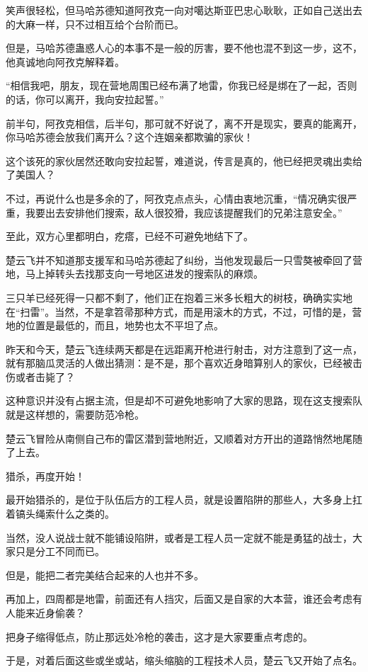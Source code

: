 笑声很轻松，但马哈苏德知道阿孜克一向对噶达斯亚巴忠心耿耿，正如自己送出去的大麻一样，只不过相互给个台阶而已。

但是，马哈苏德蛊惑人心的本事不是一般的厉害，要不他也混不到这一步，这不，他真诚地向阿孜克解释着。

“相信我吧，朋友，现在营地周围已经布满了地雷，你我已经是绑在了一起，否则的话，你可以离开，我向安拉起誓。”

前半句，阿孜克相信，后半句，那可就不好说了，离不开是现实，要真的能离开，你马哈苏德会放我们离开么？这个连姻亲都欺骗的家伙！

这个该死的家伙居然还敢向安拉起誓，难道说，传言是真的，他已经把灵魂出卖给了美国人？

不过，再说什么也是多余的了，阿孜克点点头，心情由衷地沉重，“情况确实很严重，我要出去安排他们搜索，敌人很狡猾，我应该提醒我们的兄弟注意安全。”

至此，双方心里都明白，疙瘩，已经不可避免地结下了。

楚云飞并不知道那支援军和马哈苏德起了纠纷，当他发现最后一只雪獒被牵回了营地，马上掉转头去找那支向一号地区进发的搜索队的麻烦。

三只羊已经死得一只都不剩了，他们正在抱着三米多长粗大的树枝，确确实实地在“扫雷”。当然，不是拿笤帚那种方式，而是用滚木的方式，不过，可惜的是，营地的位置是最低的，而且，地势也太不平坦了点。

昨天和今天，楚云飞连续两天都是在远距离开枪进行射击，对方注意到了这一点，就有那脑瓜灵活的人做出猜测：是不是，那个喜欢近身暗算别人的家伙，已经被击伤或者击毙了？

这种意识并没有占据主流，但是却不可避免地影响了大家的思路，现在这支搜索队就是这样想的，需要防范冷枪。

楚云飞冒险从南侧自己布的雷区潜到营地附近，又顺着对方开出的道路悄然地尾随了上去。

猎杀，再度开始！

最开始猎杀的，是位于队伍后方的工程人员，就是设置陷阱的那些人，大多身上扛着镐头绳索什么之类的。

当然，没人说战士就不能铺设陷阱，或者是工程人员一定就不能是勇猛的战士，大家只是分工不同而已。

但是，能把二者完美结合起来的人也并不多。

再加上，四周都是地雷，前面还有人挡灾，后面又是自家的大本营，谁还会考虑有人能来近身偷袭？

把身子缩得低点，防止那远处冷枪的袭击，这才是大家要重点考虑的。

于是，对着后面这些或坐或站，缩头缩脑的工程技术人员，楚云飞又开始了点名。


